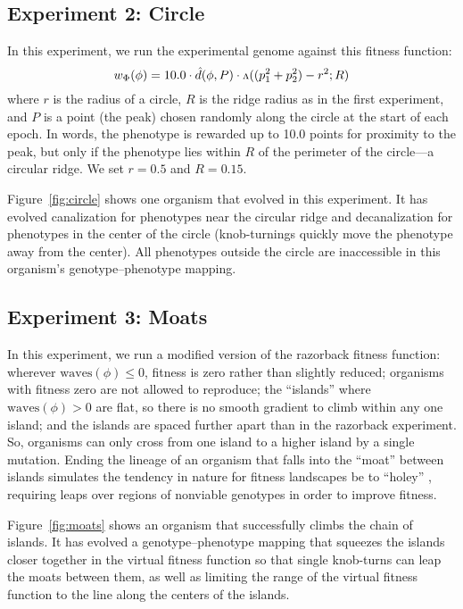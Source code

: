 \documentclass[letterpaper]{article}
\newcommand{\invv}{\ensuremath{\rotatebox[origin=c]{180}{\textrm{v}}}\xspace}
\begin{document}
\subsection{Experiment 2: Circle}

In this experiment, we run the experimental genome against this fitness
function:
\[
  w_\Phi(\phi) = 10.0 \cdot \hat{d}(\phi, P)
                      \cdot \invv((p_1^2 + p_2^2) - r^2; R)
\]
where $r$ is the radius of a circle, $R$ is the ridge radius as in the first
experiment, and $P$ is a point (the peak) chosen randomly along the circle
at the start of each epoch. In words, the phenotype is rewarded up to 10.0
points for proximity to the peak, but only if the phenotype lies within $R$
of the perimeter of the circle---a circular ridge. We set $r=0.5$ and $R=0.15$.

Figure~\ref{fig:circle} shows one organism that evolved in this experiment. It
has evolved canalization for phenotypes near the circular ridge and
decanalization for phenotypes in the center of the circle (knob-turnings
quickly move the phenotype away from the center). All phenotypes outside the
circle are inaccessible in this organism's genotype--phenotype mapping.

\subsection{Experiment 3: Moats}

In this experiment, we run a modified version of the razorback fitness
function: wherever $\text{waves}(\phi) \leq 0$, fitness is zero rather than
slightly reduced; organisms with fitness zero are not allowed to
reproduce; the ``islands'' where $\text{waves}(\phi) > 0$ are flat, so
there is no smooth gradient to climb within any one island; and the islands are
spaced further apart than in the razorback experiment. So, organisms can only
cross from one island to a higher island by a single mutation. Ending the
lineage of an organism that falls into the ``moat'' between islands simulates
the tendency in nature for fitness landscapes be to ``holey''
\citep{gavrilets1997evolution}, requiring leaps over regions of
nonviable genotypes in order to improve fitness.

Figure~\ref{fig:moats} shows an organism that successfully climbs the chain of
islands.  It has evolved a genotype--phenotype mapping that squeezes the
islands closer together in the virtual fitness function so that single
knob-turns can leap the moats between them, as well as limiting the range of
the virtual fitness function to the line along the centers of the islands.
\end{document}
